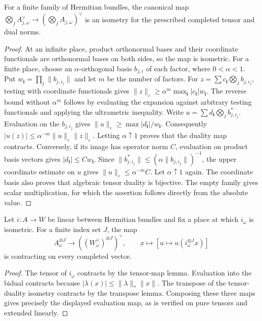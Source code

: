 \begin{lemma}
\label{lem:contraction-tensor-duality}
\leanok
For a finite family of Hermitian bundles, the canonical map
$\bigotimes_j A_{j,\omega}^\vee\to(\bigotimes_j A_{j,\omega})^\vee$
is an isometry for the prescribed completed tensor and dual norms.
\end{lemma}
\begin{proof}
At an infinite place, product orthonormal bases and their coordinate
functionals are orthonormal bases on both sides, so the map is isometric.
For a finite place, choose an $\alpha$-orthogonal basis $b_{j,i}$ of each
factor, where $0<\alpha<1$. Put $w_{\mathbf i}=\prod_j\|b_{j,i_j}\|$
and let $m$ be the number of factors.
For $z=\sum c_{\mathbf i}\bigotimes_j b_{j,i_j}$, testing with coordinate
functionals gives
$\|z\|_\varepsilon\geq\alpha^m\max_{\mathbf i}|c_{\mathbf i}|w_{\mathbf i}$.
The reverse bound without $\alpha^m$ follows by evaluating the expansion
against arbitrary testing functionals and applying the ultrametric inequality.
Write $u=\sum d_{\mathbf i}\bigotimes_j b_{j,i_j}^*$.
Evaluation on the $b_{j,i_j}$ gives
$\|u\|_\varepsilon\geq\max|d_{\mathbf i}|/w_{\mathbf i}$.
Consequently $|u(z)|\leq\alpha^{-m}\|u\|_\varepsilon\|z\|_\varepsilon$.
Letting $\alpha\uparrow1$ proves that the duality map contracts.
Conversely, if its image has operator norm $C$, evaluation on product basis
vectors gives $|d_{\mathbf i}|\leq Cw_{\mathbf i}$.
Since $\|b_{j,i_j}^*\|\leq(\alpha\|b_{j,i_j}\|)^{-1}$, the upper
coordinate estimate on $u$ gives $\|u\|_\varepsilon\leq\alpha^{-m}C$.
Let $\alpha\uparrow1$ again. The coordinate basis also proves that algebraic
tensor duality is bijective. The empty family gives scalar multiplication,
for which the assertion follows directly from the absolute value.
\end{proof}

\begin{lemma}
\label{lem:contraction-tensor-evaluation}
\leanok
Let $i:A\to W$ be linear between Hermitian bundles and fix a place at which
$i_\omega$ is isometric. For a finite index set $J$, the map
\[
 A_\omega^{\otimes J}\longrightarrow((W_\omega^\vee)^{\otimes J})^\vee,
 \qquad x\longmapsto[u\mapsto u(i_\omega^{\otimes J}x)]
\]
is contracting on every completed vector.
\end{lemma}
\begin{proof}
The tensor of $i_\omega$ contracts by the tensor-map lemma. Evaluation into
the bidual contracts because $|\lambda(x)|\leq\|\lambda\|_*\|x\|$.
The transpose of the tensor-duality isometry contracts by the transpose
lemma. Composing these three maps gives precisely the displayed evaluation
map, as is verified on pure tensors and extended linearly.
\end{proof}

